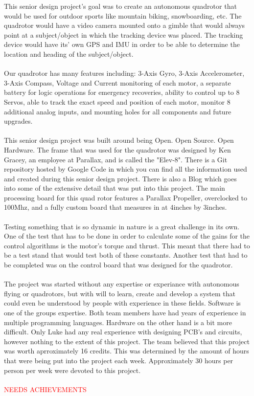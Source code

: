\documentclass{article}
\numberwithin{equation}{section} %
\begin{document}
This senior design project's goal was to create an autonomous quadrotor that would be used for outdoor sports like mountain biking, snowboarding, etc. The quadrotor would have a video camera mounted onto a gimble that would always point at a subject/object in which the tracking device was placed. The tracking device would have its' own GPS and IMU in order to be able to determine the location and heading of the subject/object.\\ \\
Our quadrotor has many features including: 3-Axis Gyro, 3-Axis Accelerometer, 3-Axis Compass, Voltage and Current monitoring of each motor, a separate battery for logic operations for emergency recoveries, ability to control up to 8 Servos, able to track the exact speed and position of each motor, monitor 8 additional analog inputs, and mounting holes for all components and future upgrades. \\ \\
This senior design project was built around being Open. Open Source. Open Hardware. The frame that was used for the quadrotor was designed by Ken Gracey, an employee at Parallax, and is called the "Elev-8". There is a Git repository hosted by Google Code in which you can find all the information used and created during this senior design project. There is also a Blog which goes into some of the extensive detail that was put into this project. The main processing board for this quad rotor features a Parallax Propeller, overclocked to 100Mhz, and a fully custom board that measures in at 4inches by 3inches. \\ \\
Testing something that is so dynamic in nature is a great challenge in its own. One of the test that has to be done in order to calculate some of the gains for the control algorithms is the motor's torque and thrust. This meant that there had to be a test stand that would test both of these constants. Another test that had to be completed was on the control board that was designed for the quadrotor. \\ \\
The project was started without any expertise or experiance with autonomous flying or quadrotors, but with will to learn, create and develop a system that could even be understood by people with experience in these fields. Software is one of the groups expertise. Both team members have had years of experience in multiple programming languages. Hardware on the other hand is a bit more difficult. Only Luke had any real experience with designing PCB's and circuits, however nothing to the extent of this project. The team believed that this project was worth aprroximately 16 credits. This was determined by the amount of hours that were being put into the project each week. Approximately 30 hours per person per week were devoted to this project. \\ \\
\textcolor{red}{NEEDS ACHIEVEMENTS}
\end{document}
